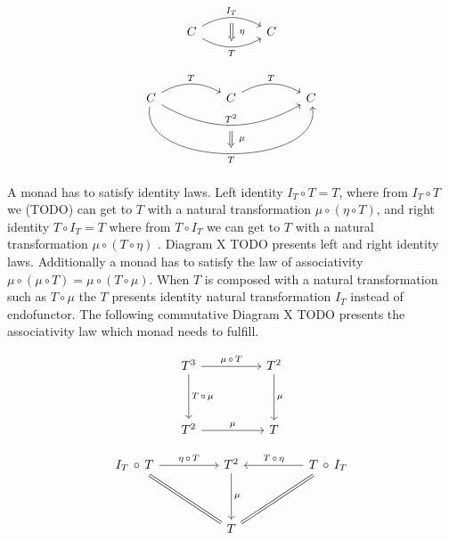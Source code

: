 \documentclass[article]{aaltoseries}
\begin{document}
    \[
      \begin{tikzcd}[column sep=huge]
        C \arrow[r, bend left, "I_T", ""{name=A, below}]
        \arrow[r, bend right, "T"{below}, ""{name=B}]
        & C
        \arrow[Rightarrow, from=A, to=B, "\eta"{right=4}]
      \end{tikzcd}
    \]

    \[
      \begin{tikzcd}[column sep=huge]
        C \arrow[r, bend left, "T"]
        \arrow[rr, bend right=30, "T^2", ""{name=A, below}]
        \arrow[rr, bend right=100, "T"{below}, ""{name=B}]
        & C
        \arrow[r, bend left, "T"]
        & C
        \arrow[Rightarrow, from=A, to=B, "\mu"{right=4}]
      \end{tikzcd}
    \]

    A monad has to satisfy identity laws. Left identity $I_T \circ T = T$, where
    from $I_T \circ T$ we (TODO) can get to $T$ with a natural transformation
    $\mu \circ (\eta \circ T)$, and right identity $T \circ I_T = T$ where from
    $T \circ I_T$ we can get to $T$ with a natural transformation $\mu \circ (T
    \circ \eta)$ \cite{mac2013categories, moggi1989computational}. Diagram X
    TODO presents left and right identity laws. Additionally a monad has to
    satisfy the law of associativity $\mu \circ (\mu \circ T) = \mu \circ (T
    \circ \mu)$. When $T$ is composed with a natural transformation such as $T
    \circ \mu$ the $T$ presents identity natural transformation $I_T$ instead of
    endofunctor. The following commutative Diagram X TODO presents the
    associativity law which monad needs to fulfill.

    \[
      \begin{tikzcd}[row sep=huge, column sep=huge]
        T^3 \arrow[r, "\mu\, \circ\, T"]
        \arrow[d, "T\, \circ\, \mu"]
        & T^2 \arrow[d, "\mu"] \\
        T^2 \arrow[r, "\mu"]
        & T
      \end{tikzcd}
    \]

    \[
      \begin{tikzcd}[row sep=huge, column sep=huge]
        I_T\, \circ\, T
        \arrow[r, "\eta\, \circ\, T"]
        \arrow[dr, equal]
        & T^2
        \arrow[d, "\mu"]
        & T\, \circ\, I_T
        \arrow[l, "T\, \circ\, \eta"{above}]
        \arrow[dl, equal] \\
        {}
        & T
        &
      \end{tikzcd}
    \]
\end{document}
